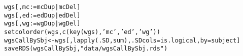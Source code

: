 \documentclass{article}\usepackage[]{graphicx}\usepackage[]{color}
\makeatletter
\newcommand{\hlstr}[1]{\textcolor[rgb]{0.063,0.58,0.627}{#1}}%
\newcommand{\hlopt}[1]{\textcolor[rgb]{0.196,0.196,0.196}{#1}}%
\newcommand{\hlstd}[1]{\textcolor[rgb]{0.196,0.196,0.196}{#1}}%
\newcommand{\hlkwb}[1]{\textcolor[rgb]{0.627,0,0.314}{#1}}%
\newcommand{\hlkwc}[1]{\textcolor[rgb]{0,0.631,0.314}{#1}}%
\newcommand{\hlkwd}[1]{\textcolor[rgb]{0.78,0.227,0.412}{#1}}%
\newenvironment{kframe}{%
 \def\at@end@of@kframe{}%
 \ifinner\ifhmode%
  \def\at@end@of@kframe{\end{minipage}}%
  \begin{minipage}{\columnwidth}%
 \fi\fi%
 \def\FrameCommand##1{\hskip\@totalleftmargin \hskip-\fboxsep
 \colorbox{shadecolor}{##1}\hskip-\fboxsep
     \hskip-\linewidth \hskip-\@totalleftmargin \hskip\columnwidth}%
 \MakeFramed {\advance\hsize-\width
   \@totalleftmargin\z@ \linewidth\hsize
   \@setminipage}}%
 {\par\unskip\endMakeFramed%
 \at@end@of@kframe}
\newenvironment{knitrout}{}{} %
\makeatother
\begin{document}
\begin{knitrout}
\begin{kframe}
\begin{alltt}
\hlstd{wgs[ , mc} \hlkwb{:=} \hlstd{mcDup} \hlopt{|} \hlstd{mcDel]}
\hlstd{wgs[ , ed} \hlkwb{:=} \hlstd{edDup} \hlopt{|} \hlstd{edDel]}
\hlstd{wgs[ , wg} \hlkwb{:=} \hlstd{wgDup} \hlopt{|} \hlstd{wgDel]}
\hlkwd{setcolorder}\hlstd{(wgs,} \hlkwd{c}\hlstd{(}\hlkwd{key}\hlstd{(wgs),} \hlstr{'mc'}\hlstd{,} \hlstr{'ed'}\hlstd{,} \hlstr{'wg'}\hlstd{))}
\hlstd{wgsCallBySbj} \hlkwb{<-} \hlstd{wgs[ ,} \hlkwd{lapply}\hlstd{(.SD, sum),} \hlkwc{.SDcols} \hlstd{= is.logical,} \hlkwc{by} \hlstd{= subject]}
\hlkwd{saveRDS}\hlstd{(wgsCallBySbj,} \hlstr{"data/wgsCallBySbj.rds"}\hlstd{)}
\end{alltt}
\end{kframe}
\end{knitrout}




\end{document}
